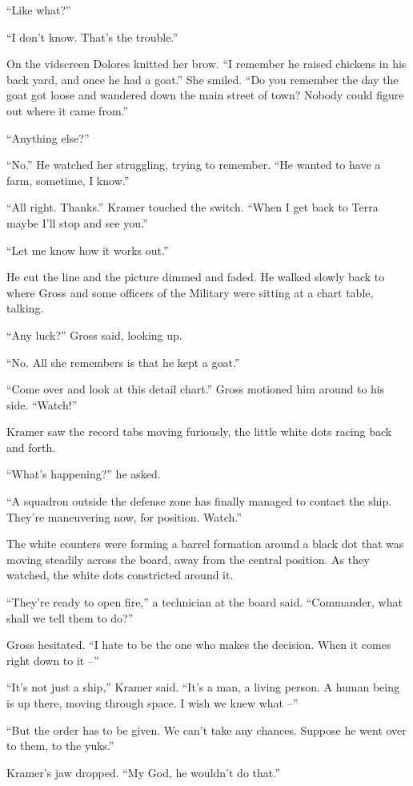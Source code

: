 \documentclass[12pt,a5paper]{book}
\begin{document}
“Like what?”

“I don't know. That's the trouble.”

On the vidscreen Dolores knitted her brow. “I remember he raised chickens in his back yard, and once he had a goat.” She smiled. “Do you remember the day the goat got loose and wandered down the main street of town? Nobody could figure out where it came from.”

“Anything else?”

“No.” He watched her struggling, trying to remember. “He wanted to have a farm, sometime, I know.”

“All right. Thanks.” Kramer touched the switch. “When I get back to Terra maybe I'll stop and see you.”

“Let me know how it works out.”

He cut the line and the picture dimmed and faded. He walked slowly back to where Gross and some officers of the Military were sitting at a chart table, talking.

“Any luck?” Gross said, looking up.

“No. All she remembers is that he kept a goat.”

“Come over and look at this detail chart.” Gross motioned him around to his side. “Watch!”

Kramer saw the record tabs moving furiously, the little white dots racing back and forth.

“What's happening?” he asked.

“A squadron outside the defense zone has finally managed to contact the ship. They're maneuvering now, for position. Watch.”

The white counters were forming a barrel formation around a black dot that was moving steadily across the board, away from the central position. As they watched, the white dots constricted around it.

“They're ready to open fire,” a technician at the board said. “Commander, what shall we tell them to do?”

Gross hesitated. “I hate to be the one who makes the decision. When it comes right down to it –”

“It's not just a ship,” Kramer said. “It's a man, a living person. A human being is up there, moving through space. I wish we knew what –”

“But the order has to be given. We can't take any chances. Suppose he went over to them, to the yuks.”

Kramer's jaw dropped. “My God, he wouldn't do that.”
\end{document}
